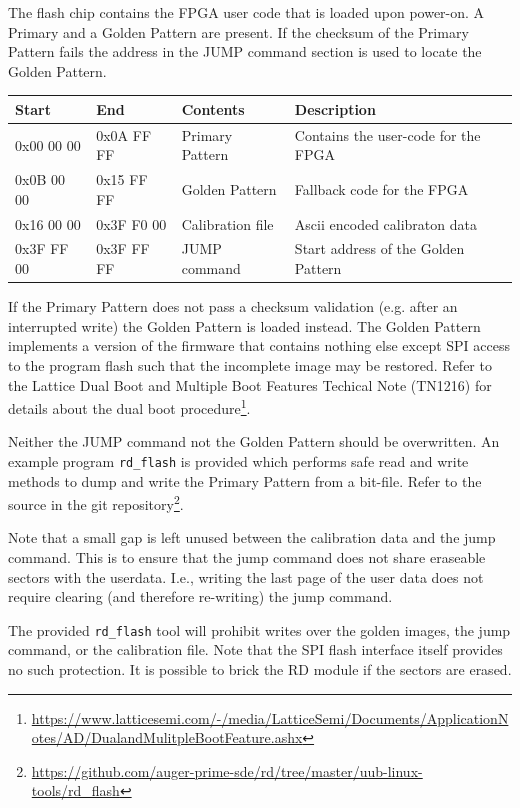 \documentclass[a4paper,indent]{paper}
\begin{document}
The flash chip contains the FPGA user code that is loaded upon power-on.
A Primary and a Golden Pattern are present. If the checksum of the Primary Pattern fails the address in the JUMP command section is used to locate the Golden Pattern.

\begin{center}
  \begin{tabular}{llll}
    Start & End & Contents & Description\\\hline
    0x00 00 00 & 0x0A FF FF & Primary Pattern & Contains the user-code for the FPGA\\
    0x0B 00 00 & 0x15 FF FF & Golden Pattern & Fallback code for the FPGA\\
    0x16 00 00 & 0x3F F0 00 & Calibration file & Ascii encoded calibraton data\\
    0x3F FF 00 & 0x3F FF FF & JUMP command & Start address of the Golden Pattern\\
  \end{tabular}
\end{center}

If the Primary Pattern does not pass a checksum validation (e.g. after an interrupted write) the Golden Pattern is loaded instead. The Golden Pattern implements a version of the firmware that contains nothing else except SPI access to the program flash such that the incomplete image may be restored.
Refer to the Lattice Dual Boot and Multiple Boot Features Techical Note (TN1216) for details about the dual boot procedure\footnote{\url{https://www.latticesemi.com/-/media/LatticeSemi/Documents/ApplicationNotes/AD/DualandMulitpleBootFeature.ashx}}.

Neither the JUMP command not the Golden Pattern should be overwritten.
An example program \texttt{rd\_flash} is provided which performs safe read and write methods to dump and write the Primary Pattern from a bit-file.
Refer to the source in the git repository\footnote{\url{https://github.com/auger-prime-sde/rd/tree/master/uub-linux-tools/rd_flash}}.

Note that a small gap is left unused between the calibration data and the jump command. This is to ensure that the jump command does not share eraseable sectors with the userdata. I.e., writing the last page of the user data does not require clearing (and therefore re-writing) the jump command.

The provided \texttt{rd\_flash} tool will prohibit writes over the golden images, the jump command, or the calibration file. Note that the SPI flash interface itself provides no such protection. It is possible to brick the RD module if the sectors are erased.
\end{document}
